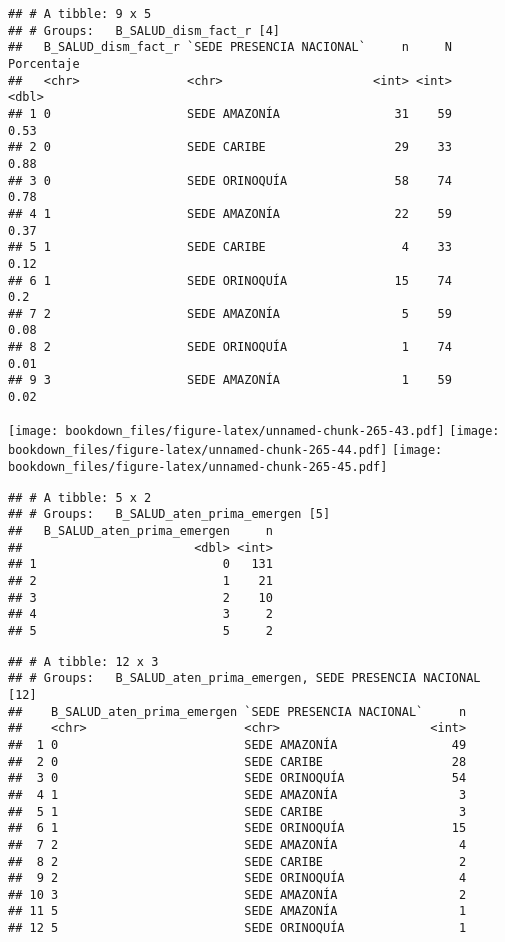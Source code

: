 \documentclass[]{article}
\theoremstyle{definition}
\theoremstyle{definition}
\theoremstyle{definition}
\theoremstyle{remark}
\begin{document}
\begin{verbatim}
## # A tibble: 9 x 5
## # Groups:   B_SALUD_dism_fact_r [4]
##   B_SALUD_dism_fact_r `SEDE PRESENCIA NACIONAL`     n     N Porcentaje
##   <chr>               <chr>                     <int> <int>      <dbl>
## 1 0                   SEDE AMAZONÍA                31    59       0.53
## 2 0                   SEDE CARIBE                  29    33       0.88
## 3 0                   SEDE ORINOQUÍA               58    74       0.78
## 4 1                   SEDE AMAZONÍA                22    59       0.37
## 5 1                   SEDE CARIBE                   4    33       0.12
## 6 1                   SEDE ORINOQUÍA               15    74       0.2 
## 7 2                   SEDE AMAZONÍA                 5    59       0.08
## 8 2                   SEDE ORINOQUÍA                1    74       0.01
## 9 3                   SEDE AMAZONÍA                 1    59       0.02
\end{verbatim}

\texttt{[image: bookdown\_files/figure-latex/unnamed-chunk-265-43.pdf]}
\texttt{[image: bookdown\_files/figure-latex/unnamed-chunk-265-44.pdf]}
\texttt{[image: bookdown\_files/figure-latex/unnamed-chunk-265-45.pdf]}

\begin{verbatim}
## # A tibble: 5 x 2
## # Groups:   B_SALUD_aten_prima_emergen [5]
##   B_SALUD_aten_prima_emergen     n
##                        <dbl> <int>
## 1                          0   131
## 2                          1    21
## 3                          2    10
## 4                          3     2
## 5                          5     2
\end{verbatim}

\begin{verbatim}
## # A tibble: 12 x 3
## # Groups:   B_SALUD_aten_prima_emergen, SEDE PRESENCIA NACIONAL [12]
##    B_SALUD_aten_prima_emergen `SEDE PRESENCIA NACIONAL`     n
##    <chr>                      <chr>                     <int>
##  1 0                          SEDE AMAZONÍA                49
##  2 0                          SEDE CARIBE                  28
##  3 0                          SEDE ORINOQUÍA               54
##  4 1                          SEDE AMAZONÍA                 3
##  5 1                          SEDE CARIBE                   3
##  6 1                          SEDE ORINOQUÍA               15
##  7 2                          SEDE AMAZONÍA                 4
##  8 2                          SEDE CARIBE                   2
##  9 2                          SEDE ORINOQUÍA                4
## 10 3                          SEDE AMAZONÍA                 2
## 11 5                          SEDE AMAZONÍA                 1
## 12 5                          SEDE ORINOQUÍA                1
\end{verbatim}
\end{document}
